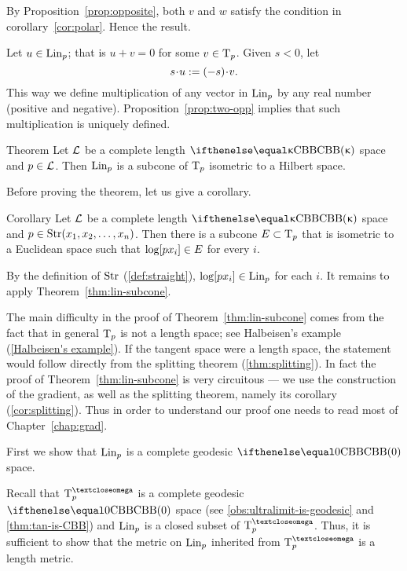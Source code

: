 By Proposition~\ref{prop:opposite}, both $v$ and $w$ satisfy the condition in corollary~\ref{cor:polar}. 
Hence the result.\qeds

Let $u\in \Lin_p$; that is $u+v=0$ for some $v\in\T_p$.
Given $s<0$, let 
\[s\cdot u\df (-s)\cdot v.\]
This way we define multiplication of any vector in $\mathop{\rm Lin}\nolimits_p$ by any real number (positive and negative).
Proposition~\ref{prop:two-opp} implies that such multiplication is uniquely defined.


\begin{thm}{Theorem}\label{thm:lin-subcone}
Let $\mathcal{L}$  be a complete length $\Alex{\kappa}$ space and $p\in \spc{L}$. 
Then $\mathop{\rm Lin}\nolimits_p$ is a subcone of $\text{\rm T}_p$ isometric to a Hilbert space.
\end{thm}

Before proving the theorem, 
let us give a corollary.

\begin{thm}{Corollary}\label{cor:euclid-subcone}
Let $\mathcal{L}$  be a complete length $\Alex{\kappa}$ space
and $p\in \Str(x_1,x_2,\dots,x_n)$.
Then there is a subcone $E\subset \T_p$ that is isometric to a Euclidean space such that $\ddir p{x_i}\in E$ for every $i$.
\end{thm}

By the definition of $\mathop{\rm Str}\nolimits$ (\ref{def:straight}), $\ddir{p}{x_i}\in \Lin_p$ for each $i$.
It remains to apply Theorem~\ref{thm:lin-subcone}.
\qeds

The main difficulty in the proof of Theorem~\ref{thm:lin-subcone} comes from the fact that in general $\text{\rm T}_p$ is not a length space;
see Halbeisen's example (\ref{Halbeisen's example}).
If the tangent space were a length space, the statement would follow directly from the splitting theorem (\ref{thm:splitting}).
In fact the proof of Theorem~\ref{thm:lin-subcone}
   is very circuitous --- we use the construction of the gradient, as well as the splitting theorem, namely its corollary (\ref{cor:splitting}).
Thus in order to understand our proof one needs to read most of Chapter~\ref{chap:grad}.

First we show that $\mathop{\rm Lin}\nolimits_p$ is a complete geodesic $\Alex0$ space.

Recall that $\T^\o_p$ is a complete geodesic $\Alex0$ space (see \ref{obs:ultralimit-is-geodesic} and \ref{thm:tan-is-CBB}) and $\mathop{\rm Lin}\nolimits_p$ is a closed subset of $\T^\o_p$.
Thus, it is sufficient to show that the metric on $\mathop{\rm Lin}\nolimits_p$ inherited from $\T^\o_p$ is a length metric.

